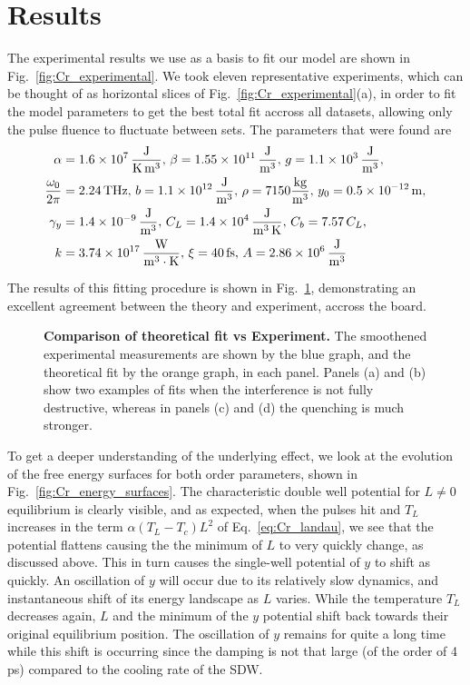 \section{Results}
The experimental results we use as a basis to fit our model are shown in Fig.~\ref{fig:Cr_experimental}.
We took eleven representative experiments, which can be thought of as horizontal slices of Fig.~\ref{fig:Cr_experimental}(a), in order to fit the model parameters to get the best total fit accross all datasets, allowing only the pulse fluence to fluctuate between sets.
The parameters that were found are
\begin{align}
	\alpha &= \SI{1.6e7} {\rm \frac{J}{K\, m^3}},\, \beta = \SI{1.55e11} {\rm \frac{J}{m^3}},\, g = \SI{1.1e3}{\rm \frac{J}{m^3}}, \\
	\frac{\omega_0}{2\pi} &= 2.24\, {\rm THz},\, b = \SI{1.1e12} {\rm \frac{J}{m^3}},\, \rho = 7150 {\rm \frac{kg}{m^3}},\, y_0 = \SI{0.5e-12} {\rm m},\\
	\gamma_y &= \SI{1.4e-9}{\rm \frac{J}{m^3}}, \, C_L = \SI{1.4e4}{\rm \frac{J}{m^3\,K}},\, C_b = 7.57\,C_L,\\
	k &= \SI{3.74e17} {\rm \frac{W}{m^3\cdot K}},\, \xi = 40\,{\rm fs},\,A = \SI{2.86e6}{\rm \frac{J}{m^3}}
\end{align}

The results of this fitting procedure is shown in Fig.~\ref{fig:Cr_theoretical_fit}, demonstrating an excellent agreement between the theory and experiment, accross the board.
\begin{figure}
\caption{\label{fig:Cr_theoretical_fit} {\bf Comparison of theoretical fit vs Experiment.} The smoothened experimental measurements are shown by the blue graph, and the theoretical fit by the orange graph, in each panel. Panels (a) and (b) show two examples of fits when the interference is not fully destructive, whereas in panels (c) and (d) the quenching is much stronger.}
\end{figure}

To get a deeper understanding of the underlying effect, we look at the evolution of the free energy surfaces for both order parameters, shown in Fig.~\ref{fig:Cr_energy_surfaces}.
The characteristic double well potential for $L\neq0$ equilibrium is clearly visible, and as expected, when the pulses hit and $T_L$ increases in the term $\alpha(T_L-T_c)L^2$ of Eq.~\ref{eq:Cr_landau}, we see that the potential flattens causing the the minimum of $L$ to very quickly change, as discussed above.
This in turn causes the single-well potential of $y$ to shift as quickly.
An oscillation of $y$ will occur due to its relatively slow dynamics, and instantaneous shift of its energy landscape as $L$ varies.
While the temperature $T_L$ decreases again, $L$ and the minimum of the $y$ potential shift back towards their original equilibrium position.
The oscillation of $y$ remains for quite a long time while this shift is occurring since the damping is not that large (of the order of 4 ps) compared to the cooling rate of the SDW.

